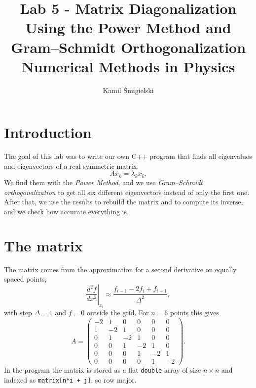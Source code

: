 \documentclass{article}
\begin{document}
\title{Lab 5 - Matrix Diagonalization Using the Power Method and Gram--Schmidt Orthogonalization\\
\large{Numerical Methods in Physics}}
\author{Kamil Śmigielski}

\maketitle

\section{Introduction}

The goal of this lab was to write our own C++ program that finds all eigenvalues and eigenvectors of a real
symmetric matrix.
\begin{equation}
    A x_k = \lambda_k x_k .
\end{equation}
We find them with the \emph{Power Method}, and we use \emph{Gram--Schmidt orthogonalization} to get all six
different eigenvectors instead of only the first one. After that, we use the results to rebuild the matrix and
to compute its inverse, and we check how accurate everything is.

\section{The matrix}

The matrix comes from the approximation for a second derivative on equally spaced points,
\begin{equation}
    \left.\frac{d^2 f}{dx^2}\right|_{x_i} \approx \frac{f_{i-1} - 2f_i + f_{i+1}}{\Delta^2},
\end{equation}
with step $\Delta = 1$ and $f = 0$ outside the grid. For $n = 6$ points this gives
\begin{equation}
A = \begin{pmatrix}
-2 & 1 & 0 & 0 & 0 & 0\\
1 & -2 & 1 & 0 & 0 & 0\\
0 & 1 & -2 & 1 & 0 & 0\\
0 & 0 & 1 & -2 & 1 & 0\\
0 & 0 & 0 & 1 & -2 & 1\\
0 & 0 & 0 & 0 & 1 & -2
\end{pmatrix}.
\end{equation}
In the program the matrix is stored as a flat \texttt{double} array of size $n \times n$ and
indexed as \texttt{matrix[n*i + j]}, so row major.
\end{document}
